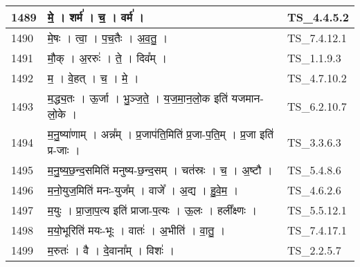 \documentclass[17pt]{extarticle}
\begin{document}
\begin{longtable}{||p{0.4in}||p{4.9in}||p{0.9in}||}
    1489 & मे॒   ।   शर्म॑   ।   च॒   ।   वर्म॑   ।    & TS\_4.4.5.2       \\
    
    \hline
        
    1490 & मे॒षः   ।   त्वा॒   ।   प॒च॒तैः   ।   अ॒व॒तु॒   ।    & TS\_7.4.12.1       \\
    
    \hline
        
    1491 & मौ॒क्   ।   अ॒ररुः॑   ।   ते॒   ।   दिव᳚म्   ।    & TS\_1.1.9.3       \\
    
    \hline
        
    1492 & म॒   ।   वे॒हत्   ।   च॒   ।   मे॒   ।    & TS\_4.7.10.2       \\
    
    \hline
        
    1493 & म॒द्ध्य॒तः   ।   ऊ॒र्जा   ।   भु॒ञ्ज॒ते॒   ।   य॒ज॒मा॒न॒लो॒क इति॑ यजमान{-}लो॒के   ।    & TS\_6.2.10.7       \\
    
    \hline
        
    1494 & म॒नु॒ष्या॑णाम्   ।   अन्न᳚म्   ।   प्र॒जाप॑ति॒मिति॑ प्र॒जा{-}प॒ति॒म्   ।   प्र॒जा इति॑ प्र{-}जाः   ।    & TS\_3.3.6.3       \\
    
    \hline
        
    1495 & म॒नु॒ष्य॒छ॒न्द॒समिति॑ मनुष्य{-}छ॒न्द॒सम्   ।   चत॑स्रः   ।   च॒   ।   अ॒ष्टौ   ।    & TS\_5.4.8.6       \\
    
    \hline
        
    1496 & म॒नो॒युज॒मिति॑ मनः{-}युज᳚म्   ।   वाजे᳚   ।   अ॒द्य   ।   हु॒वे॒म॒   ।    & TS\_4.6.2.6       \\
    
    \hline
        
    1497 & म॒युः   ।   प्रा॒जा॒प॒त्य इति॑ प्राजा{-}प॒त्यः   ।   ऊ॒लः   ।   हली᳚क्ष्णः   ।    & TS\_5.5.12.1       \\
    
    \hline
        
    1498 & म॒यो॒भूरिति॑ मयः{-}भूः   ।   वातः॑   ।   अ॒भीति॑   ।   वा॒तु॒   ।    & TS\_7.4.17.1       \\
    
    \hline
        
    1499 & म॒रुतः॑   ।   वै   ।   दे॒वाना᳚म्   ।   विशः॑   ।    & TS\_2.2.5.7       \\
    

\end{longtable}
\end{document}
